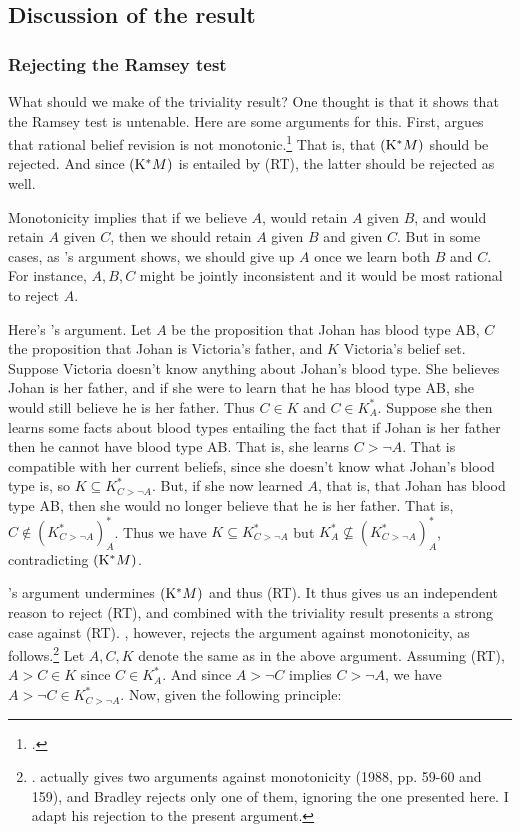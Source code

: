\documentclass[12pt]{article}
\begin{document}
\subsection{Discussion of the result}

\subsubsection{Rejecting the Ramsey test}

What should we make of the triviality result? One thought is that it shows that the Ramsey test is untenable. Here are some arguments for this. First, \gf{} argues that rational belief revision is not monotonic.\footnote{.} That is, that $\pst{*M}$ should be rejected. And since $\pst{*M}$ is entailed by (RT), the latter should be rejected as well.

Monotonicity implies that if we believe $A$, would retain $A$ given $B$, and would retain $A$ given $C$, then we should retain $A$ given $B$ and given $C$. But in some cases, as \gf's argument shows, we should give up $A$ once we learn both $B$ and $C$. For instance, $A,B,C$ might be jointly inconsistent and it would be most rational to reject $A$.

Here's \gf's argument. Let $A$ be the proposition that Johan has blood type AB, $C$ the proposition that Johan is Victoria's father, and $K$ Victoria's belief set. Suppose Victoria doesn't know anything about Johan's blood type. She believes Johan is her father, and if she were to learn that he has blood type AB, she would still believe he is her father. Thus $C\in K$ and $C\in K_A^*$. Suppose she then learns some facts about blood types entailing the fact that if Johan is her father then he cannot have blood type AB. That is, she learns $C > \neg A$. That is compatible with her current beliefs, since she doesn't know what Johan's blood type is, so $K \subseteq K_{C > \neg A}^*$. But, if she now learned $A$, that is, that Johan has blood type AB, then she would no longer believe that he is her father. That is, $C \not\in (K_{C > \neg A}^*)_A^*$. Thus we have $K \subseteq K_{C > \neg A}^*$ but $K_A^* \not\subseteq (K_{C > \neg A}^*)_A^*$, contradicting $\pst{*M}$.

\gf's argument undermines $\pst{*M}$ and thus (RT). It thus gives us an independent reason to reject (RT), and combined with the triviality result presents a strong case against (RT). \brad{}, however, rejects the argument against monotonicity, as follows.\footnote{. \gf{} actually gives two arguments against monotonicity (1988, pp. 59-60 and 159), and Bradley rejects only one of them, ignoring the one presented here. I adapt his rejection to the present argument.} Let $A,C,K$ denote the same as in the above argument. Assuming (RT), $A > C\in K$ since $C \in K_A^*$. And since $A > \neg C$ implies $C > \neg A$, we have $A > \neg C \in K_{C > \neg A}^*$. Now, given the following principle:
\end{document}
